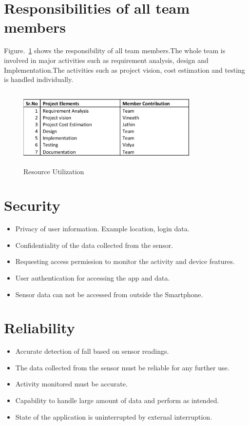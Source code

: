 \documentclass[conference]{IEEEtran}
\begin{document}
\section{Responsibilities of all team members}
Figure.~\ref{fig3} shows the responsibility of all team members.The whole team is involved in major activities such as requirement analysis, design and Implementation.The activities such as project vision, cost estimation and testing is handled individually.  
\begin{figure}
\centerline{\includegraphics[width=9cm,height=4cm]{Resource utilization diagram-1.png}}
\caption{Resource Utilization}
\label{fig3}
\end{figure}

\section{Security}
\begin{itemize}
\item Privacy of user information. Example location, login data.
\item Confidentiality of the data collected from the sensor.
\item Requesting access permission to monitor the activity and device features.
\item User authentication for accessing the app and data. 
\item Sensor data can not be accessed from outside the Smartphone.
\end{itemize}

\section{Reliability}
\begin{itemize}
\item Accurate detection of fall based on sensor readings.
\item The data collected from the sensor must be reliable for any further use.
\item Activity monitored must be accurate.
\item Capability to handle large amount of data and perform as intended.
\item State of the application is uninterrupted by external interruption.
\end{itemize}
\end{document}
